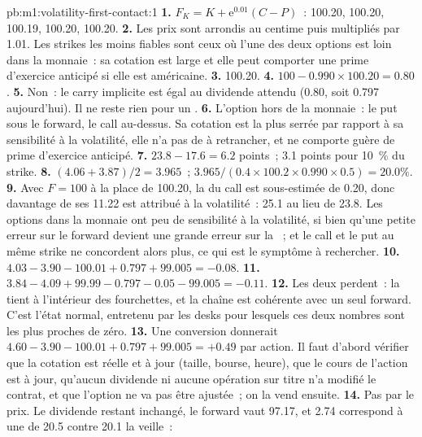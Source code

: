 \begin{solution}{pb:m1:volatility-first-contact:1}
\textbf{1.} $F_K = K + \mathrm{e}^{0.01}(C - P)$~: 100.20, 100.20, 100.19,
100.20, 100.20.
\textbf{2.} Les prix sont arrondis au centime puis multipliés par 1.01. Les strikes les moins
fiables sont ceux où l'une des deux options est loin dans la monnaie~:
sa cotation est large et elle peut comporter une prime d'exercice anticipé si elle est américaine.
\textbf{3.} 100.20.
\textbf{4.} $100 - 0.990 \times 100.20 = 0.80$.
\textbf{5.} Non~: le carry implicite est égal au dividende attendu (0.80, soit
0.797 aujourd'hui). Il ne reste rien pour un .
\textbf{6.} L'option hors de la monnaie~: le put sous le forward, le call
au-dessus. Sa cotation est la plus serrée par rapport à sa sensibilité à la volatilité,
elle n'a pas de  à retrancher, et ne comporte guère de prime d'exercice anticipé.
\textbf{7.} $23.8 - 17.6 = 6.2$ points~; 3.1 points pour 10~\% du strike.
\textbf{8.} $(4.06 + 3.87)/2 = 3.965$~; $3.965/(0.4 \times 100.2 \times 0.990
\times 0.5) = 20.0\%$.
\textbf{9.} Avec $F = 100$ à la place de 100.20, la  du call est
sous-estimée de 0.20, donc davantage de ses 11.22 est attribué à la volatilité~: 25.1
au lieu de 23.8. Les options dans la monnaie ont peu de sensibilité à la volatilité, si bien
qu'une petite erreur sur le forward devient une grande erreur sur la ~;
et le call et le put au même strike ne concordent alors plus, ce qui
est le symptôme à rechercher.
\textbf{10.} $4.03 - 3.90 - 100.01 + 0.797 + 99.005 = -0.08$.
\textbf{11.} $3.84 - 4.09 + 99.99 - 0.797 - 0.05 - 99.005 = -0.11$.
\textbf{12.} Les deux perdent~: la  tient à l'intérieur des fourchettes, et la
chaîne est cohérente avec un seul forward. C'est l'état normal, entretenu par
les desks pour lesquels ces deux nombres sont les plus proches de zéro.
\textbf{13.} Une conversion donnerait $4.60 - 3.90 - 100.01 + 0.797 + 99.005 =
+0.49$ par action. Il faut d'abord vérifier que la cotation est réelle et à jour (taille,
bourse, heure), que le cours de l'action est à jour, qu'aucun dividende ni
aucune opération sur titre n'a modifié le contrat, et que l'option ne va pas être
ajustée~; on la vend ensuite.
\textbf{14.} Pas par le prix. Le dividende restant inchangé, le forward vaut
97.17, et 2.74 correspond à une  de 20.5 contre 20.1 la veille~:

\end{solution}
